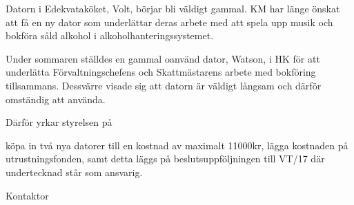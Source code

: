 \documentclass[../_main/handlingar.tex]{subfiles}
\begin{document}

Datorn i Edekvataköket, Volt, börjar bli väldigt gammal. KM har länge önskat att få en ny dator som underlättar deras arbete med att spela upp musik och bokföra såld alkohol i alkoholhanteringssystemet.

Under sommaren ställdes en gammal oanvänd dator, Watson, i HK för att underlätta Förvaltningschefens och Skattmästarens arbete med bokföring tillsammans. Dessvärre visade sig att datorn är väldigt långsam och därför omständig att använda.

Därför yrkar styrelsen på
\begin{attsatser}
    \att köpa in två nya datorer till en kostnad av maximalt 11000kr,
    \att lägga kostnaden på utrustningsfonden, samt
    \att detta läggs på beslutsuppföljningen till VT/17 där undertecknad står som ansvarig.
\end{attsatser}

\begin{signatures}{1}
    \ist
    \signature{Erik Månsson}{Kontaktor}
\end{signatures}
\end{document}
